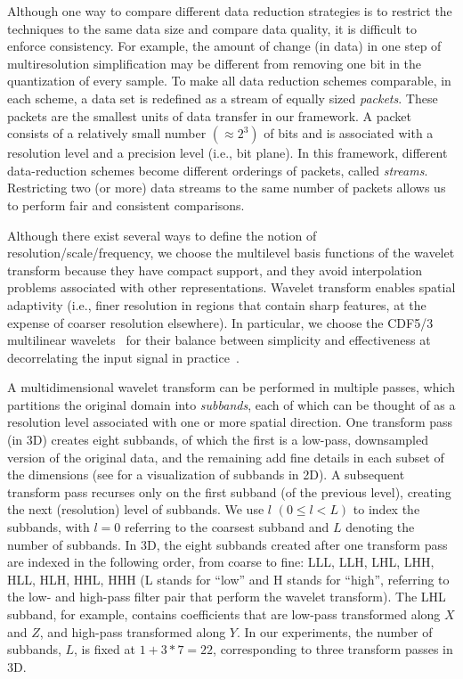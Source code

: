 Although one way to compare different data reduction strategies is to restrict the techniques to the
same data size and compare data quality, it is difficult to enforce consistency. For example, the
amount of change (in data) in one step of multiresolution simplification may be different from
removing one bit in the quantization of every sample. To make all data reduction schemes comparable,
in each scheme, a data set is redefined as a stream of equally sized \emph{packets}. These packets
are the smallest units of data transfer in our framework. A packet consists of a relatively small
number $\left(\approx 2^3\right)$ of bits and is associated with a resolution level and a precision
level (i.e., bit plane). In this framework, different data-reduction schemes become different
orderings of packets, called \emph{streams}. Restricting two (or more) data streams to the same
number of packets allows us to perform fair and consistent comparisons.

Although there exist several ways to define the notion of resolution/scale/frequency, we choose the
multilevel basis functions of the wavelet transform because they have compact support, and they
avoid interpolation problems associated with other representations. Wavelet transform enables
spatial adaptivity (i.e., finer resolution in regions that contain sharp features, at the expense of
coarser resolution elsewhere). In particular, we choose the CDF5/3 multilinear
wavelets~\cite{cdf-wavelets} for their balance between simplicity and effectiveness at decorrelating
the input signal in practice~\cite{jpeg2000}.

A multidimensional wavelet transform can be performed in multiple passes, which partitions the
original domain into \emph{subbands}, each of which can be thought of as a resolution level
associated with one or more spatial direction. One transform pass (in 3D) creates eight subbands, of
which the first is a low-pass, downsampled version of the original data, and the remaining add fine
details in each subset of the dimensions (see  for a visualization of subbands in
2D). A subsequent transform pass recurses only on the first subband (of the previous level),
creating the next (resolution) level of subbands. We use $l$ $(0 \leq l < L)$ to index the subbands,
with $l = 0$ referring to the coarsest subband and $L$ denoting the number of subbands. In 3D, the
eight subbands created after one transform pass are indexed in the following order, from coarse to
fine: LLL, LLH, LHL, LHH, HLL, HLH, HHL, HHH (L stands for ``low'' and H stands for ``high'',
referring to the low- and high-pass filter pair that perform the wavelet transform). The LHL
subband, for example, contains coefficients that are low-pass transformed along $X$ and $Z$, and
high-pass transformed along $Y$. In our experiments, the number of subbands, $L$, is fixed at $1 +
3*7=22$, corresponding to three transform passes in 3D.


